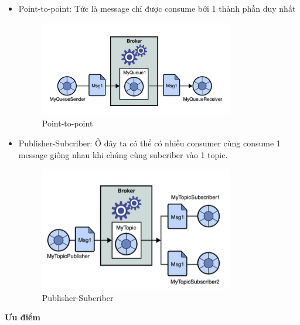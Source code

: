             \begin{itemize}
                \item Point-to-point: Tức là message chỉ được consume bởi 1 thành phần duy nhất
                
                \begin{figure}[H]   			
                	\includegraphics[width=0.8\textwidth]{Images/PTP.png}
	        		\centering
	        		\linebreak
	        		\caption{Point-to-point}
                \end{figure}
                
                \item Publisher-Subcriber: Ở đây ta có thể có nhiều consumer cùng consume 1 message giống nhau khi chúng cùng subcriber vào 1 topic.
                
                \begin{figure}[H]   			\includegraphics[width=0.8\textwidth]{Images/PS.png}
        		\centering
        		\linebreak
        		\caption{Publisher-Subcriber}
                \end{figure}
                
            \end{itemize}
            
            \textbf{Ưu điểm}
            
